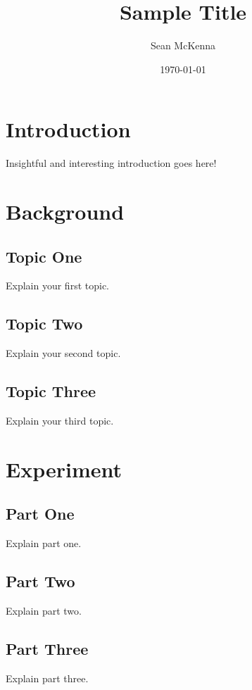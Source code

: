 \documentclass[11pt]{article}
\title{Sample Title}
\author{Sean McKenna}
\date{\today}
\begin{document}
\makeatletter
\newenvironment{ctable}{\def\@captype{table}}{}
\newenvironment{cfigure}{\def\@captype{figure}}{}
\makeatother

\maketitle

\begin{multicols}{2}
	


\section{\textbf{Introduction}}
Insightful and interesting introduction goes here!



\section{\textbf{Background}}
  \subsection{Topic One}
  Explain your first topic.
  
  \subsection{Topic Two}
  Explain your second topic.
  
  \subsection{Topic Three}
  Explain your third topic.



\section{\textbf{Experiment}}
  \subsection{Part One}
  Explain part one.
  
  \subsection{Part Two}
  Explain part two.

  \subsection{Part Three}
  Explain part three.




\end{multicols}
\end{document}
